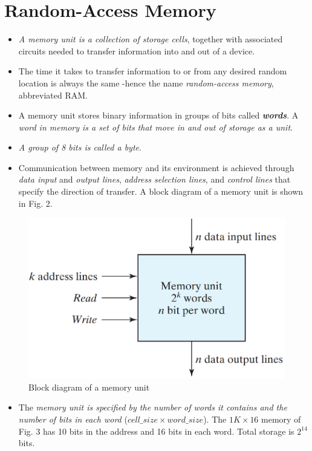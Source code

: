 \section{Random-Access Memory}
\label{sec:ram}

\begin{itemize}[leftmargin=0.6cm]
  \item \textit{A memory unit is a collection of storage cells}, together with associated circuits needed to transfer information into and out of a device.
  \item The time it takes to transfer information to or from any desired random location is always the same -hence the name \textit{random-access memory}, abbreviated RAM.
  \item A memory unit stores binary information in groups of bits called \textbf{\textit{words}}. A \textit{word in memory is a set of bits that move in and out of storage as a unit}.
  \item \textit{A group of 8 bits is called a byte}.
  \item Communication between memory and its environment is achieved through \textit{data input} and \textit{output lines}, \textit{address selection lines}, and \textit{control lines} that specify the direction of transfer. A block diagram of a memory unit is shown in Fig. 2.
\end{itemize}

\begin{figure}[H]
  \centering
  \includegraphics[width=.9\linewidth]{img/fig-7.2.png}
  \caption{Block diagram of a memory unit}
  \label{fig:7.2}
\end{figure}

\begin{itemize}[leftmargin=0.6cm]
  \item The \textit{memory unit is specified by the number of words it contains and the number of bits in each word} ($cell\_size \times word\_size$). The $1K \times 16$ memory of Fig. 3 has 10 bits in the address and 16 bits in each word. Total storage is $2^14$ bits.
\end{itemize}

